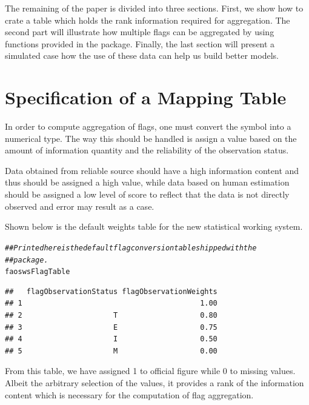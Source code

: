 \documentclass[nojss]{jss}\usepackage[]{graphicx}\usepackage[]{color}
\makeatletter
\newcommand{\hlcom}[1]{\textcolor[rgb]{0.678,0.584,0.686}{\textit{#1}}}%
\newcommand{\hlstd}[1]{\textcolor[rgb]{0.345,0.345,0.345}{#1}}%
\newenvironment{kframe}{%
 \def\at@end@of@kframe{}%
 \ifinner\ifhmode%
  \def\at@end@of@kframe{\end{minipage}}%
  \begin{minipage}{\columnwidth}%
 \fi\fi%
 \def\FrameCommand##1{\hskip\@totalleftmargin \hskip-\fboxsep
 \colorbox{shadecolor}{##1}\hskip-\fboxsep
     \hskip-\linewidth \hskip-\@totalleftmargin \hskip\columnwidth}%
 \MakeFramed {\advance\hsize-\width
   \@totalleftmargin\z@ \linewidth\hsize
   \@setminipage}}%
 {\par\unskip\endMakeFramed%
 \at@end@of@kframe}
\newenvironment{knitrout}{}{} %
\makeatother
\begin{document}
The remaining of the paper is divided into three sections. First, we
show how to crate a table which holds the rank information required
for aggregation. The second part will illustrate how multiple flags
can be aggregated by using functions provided in the package. Finally,
the last section will present a simulated case how the use of these
data can help us build better models.


\section{Specification of a Mapping Table}

In order to compute aggregation of flags, one must convert the symbol
into a numerical type. The way this should be handled is assign a
value based on the amount of information quantity and the reliability
of the observation status.

Data obtained from reliable source should have a high information
content and thus should be assigned a high value, while data based on
human estimation should be assigned a low level of score to reflect
that the data is not directly observed and error may result as a case.

Shown below is the default weights table for the new statistical
working system.

\begin{knitrout}
\color{fgcolor}\begin{kframe}
\begin{alltt}
\hlcom{## Printed here is the default flag conversion table shipped with the}
\hlcom{## package.}
\hlstd{faoswsFlagTable}
\end{alltt}
\begin{verbatim}
##   flagObservationStatus flagObservationWeights
## 1                                         1.00
## 2                     T                   0.80
## 3                     E                   0.75
## 4                     I                   0.50
## 5                     M                   0.00
\end{verbatim}
\end{kframe}
\end{knitrout}

From this table, we have assigned 1 to official figure while 0 to
missing values. Albeit the arbitrary selection of the values, it
provides a rank of the information content which is necessary for the
computation of flag aggregation.
\end{document}
